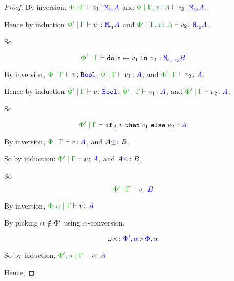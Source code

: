 \documentclass{report}
\begin{document}
\begin{framed}
\begin{proof}
            \case{\vbind}
        
            By inversion,  $\gpetyperelation{v_1}{\M{\e_1}{A}}$ and $\etyperelation{\P}{\gax}{\e_2}{\M{\e_2}{A}}$.
        
            Hence by induction $\gppetyperelation{v_1}{\M{\e_1}{A}}$ and $\etyperelation{\P'}{\gax}{v_2}{\M{\e_2}{A}}$.
        
            So
        
            \begin{equation}
                \gppetyperelation{\doin{x}{v_1}{v_2}}{\M{\e_1\dot\e_2}{B}}
            \end{equation}
        
            \case{\vif}
        
            By inversion,  $\gpetyperelation{v}{\B}$, $\gpetyperelation{v_1}{A}$, and $\gpetyperelation{v_2}{A}$.
        
            Hence by induction
            $\gppetyperelation{v}{\B}$, $\gppetyperelation{v_1}{A}$, and $\gppetyperelation{v_2}{A}$.
        
            So 
        
            \begin{equation}
                \gppetyperelation{\pifthenelse{A}{v}{v_1}{v_2}}{A}
            \end{equation}
        
            \case{\vsubtype}
            By inversion,  $\gpetyperelation{v}{A}$, and $A{\color{blue} \leq\colon} B$.
        
            So by induction:
            $\gppetyperelation{v}{A}$, and $A{\color{blue} \leq\colon} B$.
        
            So \begin{equation}
                \gppetyperelation{v}{B}
            \end{equation}
        
            \case{\vgen}
            By inversion,  $\etyperelation{\P, \a}{\G}{v}{A}$
        
            By picking $\alpha\notin\Phi'$ using $\alpha$-conversion.
        
            \begin{equation}
                \omega\times \colon {\color{blue}\Phi',\alpha} \triangleright {\color {blue} \Phi,\alpha}
            \end{equation}
        
            So by induction, $\etyperelation{\P', \a}{\G}{v}{A}$
        
            Hence,
        

\end{proof}
\end{framed}
\end{document}
